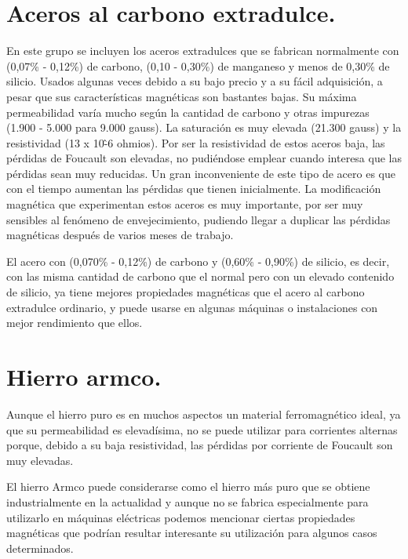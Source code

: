 \documentclass[12pt,a4paper]{article}
\begin{document}
\section{Aceros al carbono extradulce.}
En este grupo se incluyen los aceros extradulces que se fabrican normalmente con (0,07\% - 0,12\%) de carbono, (0,10 - 0,30\%) de manganeso y menos de 0,30\% de silicio. Usados algunas veces debido a su bajo precio y a su fácil adquisición, a pesar que sus características magnéticas son bastantes bajas. Su máxima permeabilidad varía mucho según la cantidad de carbono y otras impurezas (1.900 - 5.000 para 9.000 gauss). La saturación es muy elevada (21.300 gauss) y la resistividad (13 x 10\^-6 ohmios). Por ser la resistividad de estos aceros baja, las pérdidas de Foucault son elevadas, no pudiéndose emplear cuando interesa que las pérdidas sean muy reducidas. Un gran inconveniente de este tipo de acero es que con el tiempo aumentan las pérdidas que tienen inicialmente. La modificación magnética que experimentan estos aceros es muy importante, por ser muy sensibles al fenómeno de envejecimiento, pudiendo llegar a duplicar las pérdidas magnéticas después de varios meses de trabajo.

El acero con (0,070\% - 0,12\%) de carbono y (0,60\% - 0,90\%) de silicio, es decir, con las misma cantidad de carbono que el normal pero con un elevado contenido de silicio, ya tiene mejores propiedades magnéticas que el acero al carbono extradulce ordinario, y puede usarse en algunas máquinas o instalaciones con mejor rendimiento que ellos.

\section{Hierro armco.}
Aunque el hierro puro es en muchos aspectos un material ferromagnético ideal, ya que su permeabilidad es elevadísima, no se puede utilizar para corrientes alternas porque, debido a su baja resistividad, las pérdidas por corriente de Foucault son muy elevadas.

El hierro Armco puede considerarse como el hierro más puro que se obtiene industrialmente en la actualidad y aunque no se fabrica especialmente para utilizarlo en máquinas eléctricas podemos mencionar ciertas propiedades magnéticas que podrían resultar interesante su utilización para algunos casos determinados.
\end{document}
